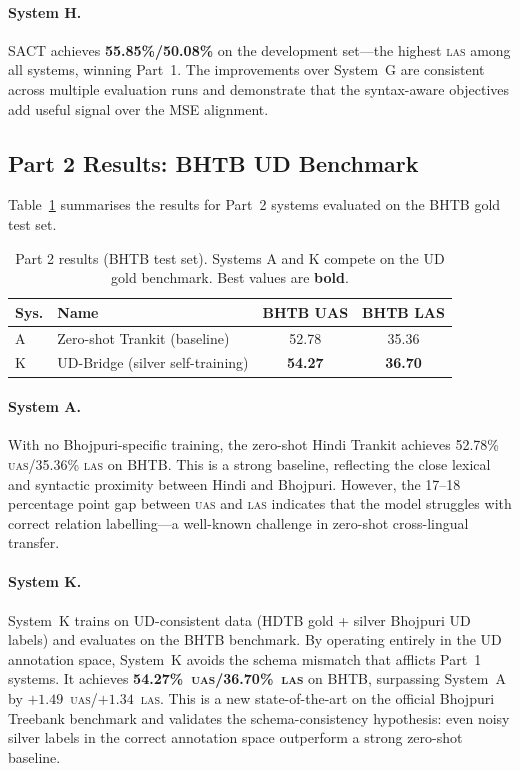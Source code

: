 \documentclass[12pt,a4paper,oneside]{report}
\newcommand{\uas}{\textsc{uas}}
\newcommand{\las}{\textsc{las}}
\begin{document}
\paragraph{System H.}
SACT achieves \textbf{55.85\%/50.08\%} on the development set---the highest \las{}
among all systems, winning Part~1. The improvements over System~G are
consistent across multiple evaluation runs and demonstrate that the syntax-aware
objectives add useful signal over the MSE alignment.

\subsection{Part 2 Results: BHTB UD Benchmark}

Table~\ref{tab:comp2_results} summarises the results for Part~2 systems
evaluated on the BHTB gold test set.

\begin{table}[ht]
\centering
\caption{Part 2 results (BHTB test set). Systems A and K compete on the UD gold benchmark. Best values are \textbf{bold}.}
\label{tab:comp2_results}
\begin{tabular}{@{}llcc@{}}
\toprule
\textbf{Sys.} & \textbf{Name} & \textbf{BHTB UAS} & \textbf{BHTB LAS} \\
\midrule
A & Zero-shot Trankit (baseline) & 52.78 & 35.36 \\
K & UD-Bridge (silver self-training) & \textbf{54.27} & \textbf{36.70} \\
\bottomrule
\end{tabular}
\end{table}

\paragraph{System A.}
With no Bhojpuri-specific training, the zero-shot Hindi Trankit achieves 52.78\%
\uas{}/35.36\% \las{} on BHTB. This is a strong baseline, reflecting the close
lexical and syntactic proximity between Hindi and Bhojpuri. However, the 17--18
percentage point gap between \uas{} and \las{} indicates that the model struggles
with correct relation labelling---a well-known challenge in zero-shot cross-lingual
transfer.

\paragraph{System K.}
System~K trains on UD-consistent data (HDTB gold + silver Bhojpuri UD labels) and
evaluates on the BHTB benchmark. By operating entirely in the UD annotation space,
System~K avoids the schema mismatch that afflicts Part~1 systems. It achieves
\textbf{54.27\%~\uas{}/36.70\%~\las{}} on BHTB, surpassing System~A by
$+1.49$~\uas{}/$+1.34$~\las{}. This is a new state-of-the-art on the official
Bhojpuri Treebank benchmark and validates the schema-consistency hypothesis: even
noisy silver labels in the correct annotation space outperform a strong zero-shot
baseline.
\end{document}

